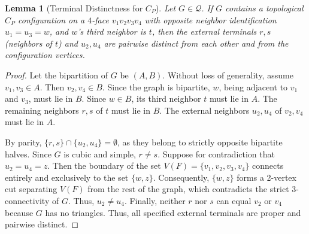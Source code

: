 \documentclass[12pt]{article}
\newtheorem{lemma}[theorem]{Lemma}
\begin{document}
\begin{lemma}[Terminal Distinctness for $C_P$]
\label{lem:app-cp-distinct}
Let $G \in \mathcal{Q}$. If $G$ contains a topological $C_P$ configuration on a $4$-face $v_1v_2v_3v_4$ with opposite neighbor identification $u_1=u_3=w$, and $w$'s third neighbor is $t$, then the external terminals $r, s$ (neighbors of $t$) and $u_2, u_4$ are pairwise distinct from each other and from the configuration vertices.
\end{lemma}
\begin{proof}
Let the bipartition of $G$ be $(A, B)$. Without loss of generality, assume $v_1, v_3 \in A$. Then $v_2, v_4 \in B$. Since the graph is bipartite, $w$, being adjacent to $v_1$ and $v_3$, must lie in $B$. Since $w \in B$, its third neighbor $t$ must lie in $A$. The remaining neighbors $r, s$ of $t$ must lie in $B$. The external neighbors $u_2, u_4$ of $v_2, v_4$ must lie in $A$.

By parity, $\{r, s\} \cap \{u_2, u_4\} = \emptyset$, as they belong to strictly opposite bipartite halves. Since $G$ is cubic and simple, $r \neq s$. Suppose for contradiction that $u_2 = u_4 = z$. Then the boundary of the set $V(F) = \{v_1, v_2, v_3, v_4\}$ connects entirely and exclusively to the set $\{w, z\}$. Consequently, $\{w, z\}$ forms a 2-vertex cut separating $V(F)$ from the rest of the graph, which contradicts the strict 3-connectivity of $G$. Thus, $u_2 \neq u_4$. Finally, neither $r$ nor $s$ can equal $v_2$ or $v_4$ because $G$ has no triangles. Thus, all specified external terminals are proper and pairwise distinct.
\end{proof}
\end{document}

